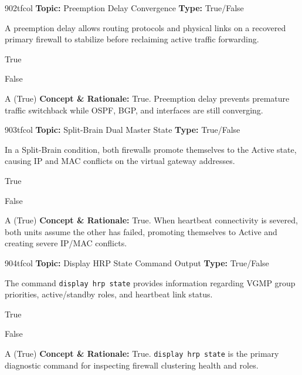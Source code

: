 \begin{qcard}{902}{tfcol}
\textcolor{darkslate!75}{\small\textbf{Topic:} Preemption Delay Convergence \hfill \textbf{Type:} True/False}\vspace{0.4em}\par
A preemption delay allows routing protocols and physical links on a recovered primary firewall to stabilize before reclaiming active traffic forwarding.
\begin{qoptions}
\item True
\item False
\end{qoptions}
\end{qcard}
\nopagebreak
\begin{explainbox}{A (True)}
\textbf{Concept \& Rationale:} True. Preemption delay prevents premature traffic switchback while OSPF, BGP, and interfaces are still converging.
\end{explainbox}

\begin{qcard}{903}{tfcol}
\textcolor{darkslate!75}{\small\textbf{Topic:} Split-Brain Dual Master State \hfill \textbf{Type:} True/False}\vspace{0.4em}\par
In a Split-Brain condition, both firewalls promote themselves to the Active state, causing IP and MAC conflicts on the virtual gateway addresses.
\begin{qoptions}
\item True
\item False
\end{qoptions}
\end{qcard}
\nopagebreak
\begin{explainbox}{A (True)}
\textbf{Concept \& Rationale:} True. When heartbeat connectivity is severed, both units assume the other has failed, promoting themselves to Active and creating severe IP/MAC conflicts.
\end{explainbox}

\begin{qcard}{904}{tfcol}
\textcolor{darkslate!75}{\small\textbf{Topic:} Display HRP State Command Output \hfill \textbf{Type:} True/False}\vspace{0.4em}\par
The command \texttt{display hrp state} provides information regarding VGMP group priorities, active/standby roles, and heartbeat link status.
\begin{qoptions}
\item True
\item False
\end{qoptions}
\end{qcard}
\nopagebreak
\begin{explainbox}{A (True)}
\textbf{Concept \& Rationale:} True. \texttt{display hrp state} is the primary diagnostic command for inspecting firewall clustering health and roles.
\end{explainbox}

